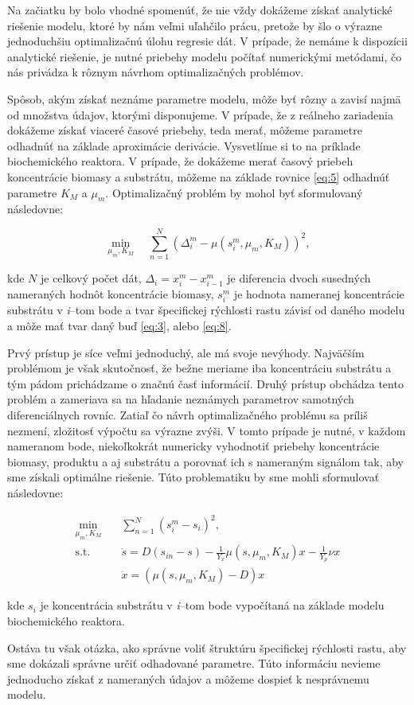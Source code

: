 Na začiatku by bolo vhodné spomenúť, že nie vždy dokážeme získať analytické riešenie modelu, ktoré by nám veľmi uľahčilo prácu, pretože by šlo o výrazne jednoduchšiu optimalizačnú úlohu regresie dát. V prípade, že nemáme k dispozícii analytické riešenie, je nutné priebehy modelu počítať numerickými metódami, čo nás privádza k rôznym návrhom optimalizačných problémov. 

Spôsob, akým získať neznáme parametre modelu, môže byť rôzny a zavisí najmä od množstva údajov, ktorými disponujeme. V prípade, že z reálneho zariadenia dokážeme získať viaceré časové priebehy, teda merať, môžeme parametre odhadnúť na základe aproximácie derivácie. Vysvetlíme si to na príklade biochemického reaktora. V prípade, že dokážeme merať časový priebeh koncentrácie biomasy a substrátu, môžeme na základe rovnice \eqref{eq:5} odhadnúť parametre $K_{M}$ a $\mu_{m}$. Optimalizačný problém by mohol byť sformulovaný následovne:

\begin{equation}
	\min_{\mu_{m},K_{M}} \quad \sum_{n=1}^{N} \left(\Delta_{i}^m-\mu(s_i^m,\mu_{m},K_M)\right)^2,  
\end{equation}

\noindent kde $ N $ je celkový počet dát, $ \Delta_{i} = x_{i}^m-x_{i-1}^m $ je diferencia dvoch susedných nameraných hodnôt koncentrácie biomasy, $ s_i^m $ je hodnota nameranej koncentrácie substrátu v \textit{i}--tom bode a tvar špecifickej rýchlosti rastu závisí od daného modelu a môže mať tvar daný buď \eqref{eq:3}, alebo \eqref{eq:8}.

Prvý prístup je síce veľmi jednoduchý, ale má svoje nevýhody. Najväčším problémom je však skutočnosť, že bežne meriame iba koncentráciu substrátu a tým pádom prichádzame o značnú časť informácií. Druhý prístup obchádza tento problém a zameriava sa na hľadanie neznámych parametrov samotných diferenciálnych rovníc. Zatiaľ čo návrh optimalizačného problému sa príliš nezmení, zložitosť výpočtu sa výrazne zvýši. V tomto prípade je nutné, v každom nameranom bode, niekoľkokrát numericky vyhodnotiť priebehy koncentrácie biomasy, produktu a aj substrátu a porovnať ich s nameraným signálom  tak, aby sme získali optimálne riešenie. Túto problematiku by sme mohli sformulovať následovne: 

\begin{equation}
	\begin{aligned}
		\min_{\mu_{m},K_{M}} \quad & \sum_{n=1}^{N} \left(s_{i}^m-s_{i}\right)^2, \\
		\textrm{s.t.} \quad & \dot{s} = D(s_{in}-s)-\frac{1}{Y_x}\mu(s,\mu_{m},K_M)x-\frac{1}{Y_p}\nu x \\
							& \dot{x} = (\mu(s,\mu_{m},K_M)-D)x
	\end{aligned}
\end{equation}

kde $ s_{i} $ je koncentrácia substrátu v \textit{i}--tom bode vypočítaná na základe modelu biochemického reaktora.

Ostáva tu však otázka, ako správne voliť štruktúru špecifickej rýchlosti rastu, aby sme dokázali správne určiť odhadované parametre. Túto informáciu nevieme jednoducho získať z nameraných údajov a môžeme dospieť k nesprávnemu modelu.
